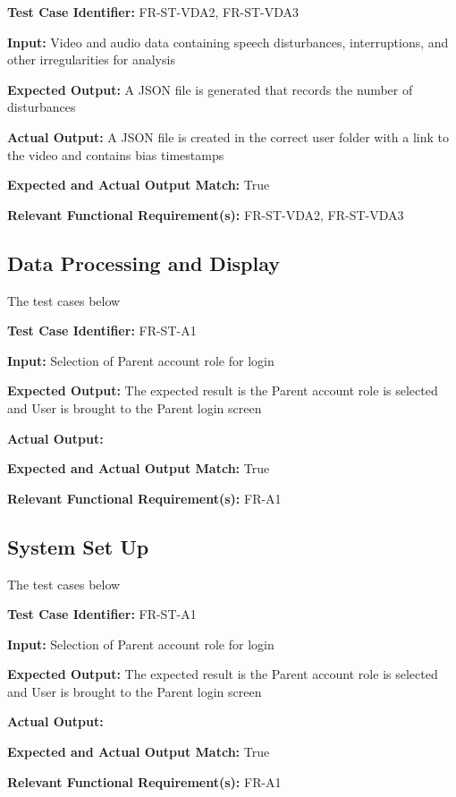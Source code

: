 \documentclass[12pt, titlepage]{article}
\begin{document}
\begin{mdframed}[linewidth=0.5mm] \par
  \textbf{Test Case Identifier:} FR-ST-VDA2, FR-ST-VDA3 \par
  \textbf{Input:} Video and audio data containing speech disturbances, interruptions, and other irregularities for analysis \par
  \textbf{Expected Output:} A JSON file is generated that records the number of disturbances \par
  \textbf{Actual Output:} A JSON file is created in the correct user folder with a link to the video and contains bias timestamps\par
  \textbf{Expected and Actual Output Match:} True \par
  \textbf{Relevant Functional Requirement(s):} FR-ST-VDA2, FR-ST-VDA3
\end{mdframed}

\subsection{Data Processing and Display}
\hspace{2em}The test cases below 

\begin{mdframed}[linewidth=0.5mm] \par
  \textbf{Test Case Identifier:} FR-ST-A1 \par
  \textbf{Input:} Selection of Parent account role for login \par
  \textbf{Expected Output:} The expected result is the Parent account role is selected and User is brought to the Parent login screen \par
  \textbf{Actual Output:} \par
  \textbf{Expected and Actual Output Match:} True \par
  \textbf{Relevant Functional Requirement(s):} FR-A1
\end{mdframed}

\subsection{System Set Up}
\hspace{2em}The test cases below 

\begin{mdframed}[linewidth=0.5mm] \par
  \textbf{Test Case Identifier:} FR-ST-A1 \par
  \textbf{Input:} Selection of Parent account role for login \par
  \textbf{Expected Output:} The expected result is the Parent account role is selected and User is brought to the Parent login screen \par
  \textbf{Actual Output:} \par
  \textbf{Expected and Actual Output Match:} True \par
  \textbf{Relevant Functional Requirement(s):} FR-A1
\end{mdframed}
\end{document}
